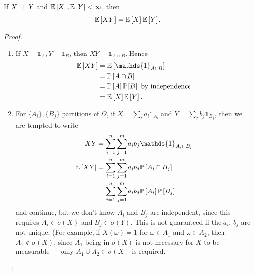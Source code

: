 \begin{lemma}
	If $X \perp\!\!\!\perp Y$ and $\mathbb{E} \left| X \right|,\mathbb{E} \left| Y \right| < \infty$, then \[
		\mathbb{E}\left[XY\right]  = \mathbb{E}\left[X\right] \mathbb{E}\left[Y\right] 
	.\] 
\end{lemma}
\begin{proof}
	\begin{enumerate}[label=(\roman*)]
		\item If $X = \mathds{1}_{A}, Y = \mathds{1}_{B}$, then $XY = \mathds{1}_{A\cap B}$. Hence
			\begin{align*}
				\E\left[XY\right] &= \E\left[\mathds{1}_{A\cap B}\right] \\
				&= \P\left[A \cap B\right]  \\
				&=\P\left[A\right] \P\left[B\right]\text{ by independence} \\
				&= \E\left[X\right] \E\left[Y\right] 
			.\end{align*}
		\item For $\{A_i\}, \{B_j\}$ partitions of $\Omega$, if $X = \sum_i a_i \mathds{1}_{A_i}$ and $Y = \sum_j b_j \mathds{1}_{B_j}$, then we are tempted to write
			\begin{align*}
				XY &=  \sum\limits_{i=1}^{n} \sum\limits_{j=1}^{m} a_i b_j \mathds{1}_{A_i \cap B_j} \\
				\E\left[XY\right] &= \sum\limits_{i=1}^{n} \sum\limits_{j=1}^{m} a_i b_j \P\left[A _i \cap B_j\right]  \\
				&= \sum\limits_{i=1}^{n} \sum\limits_{j=1}^{m} a_i b_j \P\left[A_i\right] \P\left[B_j\right]
			\end{align*}
			and continue, but we don't know $A_i$ and $B_j$ are independent, since this requires $A_i \in \sigma(X)$ and $B_j \in \sigma(Y)$. This is not guaranteed if the $a_i$, $b_j$ are not unique. (For example, if $X(\omega) = 1$ for $\omega \in A_1$ and $\omega \in A_2$, then $A_1 \not\in \sigma(X)$, since $A_1$ being in $\sigma(X)$ is not necessary for $X$ to be measurable --- only $A_1 \cup A_2 \in \sigma\left( X \right)$ is required.
			

\end{enumerate}
\end{proof}
